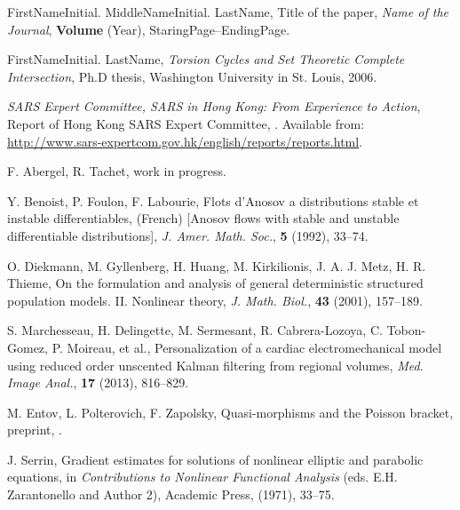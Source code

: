 \documentclass{aims}
\numberwithin{equation}{section}
\begin{document}
\begin{thebibliography}{99}

     \newblock  FirstNameInitial.  MiddleNameInitial. LastName, %
     \newblock Title of the paper,
     \newblock \emph{Name of the Journal}, \textbf{Volume} (Year), StaringPage--EndingPage.

    \newblock FirstNameInitial. LastName,
    \newblock  \emph{Torsion Cycles and Set Theoretic Complete Intersection},
    \newblock  Ph.D thesis, Washington University in St. Louis, 2006.

\newblock\emph{SARS Expert Committee, SARS in Hong Kong: From Experience to
Action}, Report of Hong Kong SARS Expert Committee,
. Available from: \url{http://www.sars-expertcom.gov.hk/english/reports/reports.html}.

\newblock F. Abergel, R. Tachet,
\newblock
\newblock work in progress.

    \newblock Y. Benoist, P. Foulon, F. Labourie, %
    \newblock Flots d'Anosov a distributions stable et instable
     differentiables,
    \newblock (French) [Anosov flows with stable and unstable differentiable
     distributions], \emph{J. Amer. Math. Soc.}, \textbf{5} (1992), 33--74.

\newblock  O. Diekmann, M. Gyllenberg, H. Huang, M. Kirkilionis, J. A. J. Metz, H. R. Thieme, 
\newblock On the formulation and analysis of general deterministic structured population models. II. Nonlinear theory, 
\emph{J. Math. Biol.}, \textbf{43} (2001), 157--189.

\newblock S. Marchesseau, H. Delingette, M. Sermesant, R. Cabrera-Lozoya, C. Tobon-Gomez, P. Moireau, et al., 
\newblock Personalization of a cardiac electromechanical model using reduced order unscented Kalman filtering from regional volumes, \emph{Med. Image Anal.}, \textbf{17} (2013), 816--829.

\newblock M. Entov, L. Polterovich, F. Zapolsky,
\newblock Quasi-morphisms and the Poisson bracket,
\newblock preprint, .

    \newblock J. Serrin,
    \newblock  Gradient estimates for solutions of nonlinear elliptic
                     and parabolic equations,
    \newblock  in \emph{Contributions to Nonlinear Functional Analysis} (eds. E.H. Zarantonello and Author 2),
                Academic Press, (1971), 33--75.


\end{thebibliography}
\end{document}
